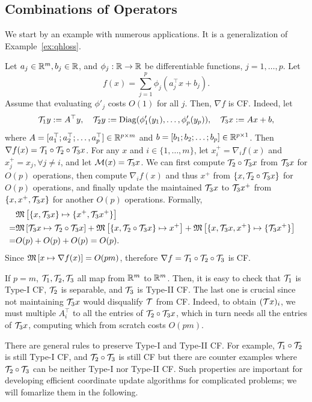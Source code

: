 \subsection{Combinations of Operators}\label{sc:comb}
We start by an example with numerous applications. It is a generalization of Example~\ref{ex:qhloss}.
\begin{example}\label{exp:log-grad} Let $a_j\in \mathbb{R}^m, b_j\in \mathbb{R}$, and $\phi_j:\mathbb{R}\to \mathbb{R}$ be differentiable functions, $j=1,\ldots,p$. Let $$f(x)=\sum_{j=1}^p \phi_j(a_j^\top x +b_j).$$ Assume that evaluating $\phi'_j$ costs $O(1)$ for all $j$. Then, $\nabla f$ is CF. Indeed, let $${\mathcal{T}}_1 y:=A^\top y,\quad {\mathcal{T}}_2 y := {\mathrm{Diag}}(\phi_1'(y_1),\ldots,\phi_p'(y_p)), \quad {\mathcal{T}}_3 x := Ax+b,$$ 
where $A=[a_1^\top; a_2^\top; \ldots,a_p^\top]\in \mathbb{R}^{p\times m}$ and $b=[b_1;b_2;\ldots;b_p]\in\mathbb{R}^{p\times 1}$. Then $\nabla f(x)= {\mathcal{T}}_1\circ{\mathcal{T}}_2\circ{\mathcal{T}}_3 x$. For any $x$ and $i\in\{1,\ldots,m\}$, let $x^+_i=\nabla_i f(x)$ and $x^+_j=x_j,\forall j\neq i$, and let ${\mathcal{M}}(x)={\mathcal{T}}_3 x$. We can first compute ${\mathcal{T}}_2\circ{\mathcal{T}}_3 x$ from ${\mathcal{T}}_3 x$ for $O(p)$ operations, then compute $\nabla_i f(x)$ and thus $x^+$ from $\{x, {\mathcal{T}}_2\circ{\mathcal{T}}_3 x\}$ for $O(p)$ operations, and finally update the maintained ${\mathcal{T}}_3 x$ to ${\mathcal{T}}_3 x^+$ from $\{x, x^+,{\mathcal{T}}_3 x\}$ for another $O(p)$ operations. Formally,
\begin{align*}
&\nops{\{x,\cT_3 x\}}{\{x^+, \cT_3x^+\}}\cr
=& \nops{\cT_3x}{\cT_2\circ\cT_3 x}+\nops {\{x,\cT_2\circ\cT_3 x\}}{x^+}+\nops{\{x,\cT_3 x, x^+\}}{\{\cT_3x^+\}}\cr
=& O(p) + O(p) +O(p)=O(p).\nonumber
\end{align*}
Since $\mathfrak{M}\left[{x}\mapsto {\nabla f(x)}\right]=O(pm)$, therefore
$\nabla f= {\mathcal{T}}_1\circ{\mathcal{T}}_2\circ{\mathcal{T}}_3$ is CF. 

If $p=m$, ${\mathcal{T}}_1,{\mathcal{T}}_2,{\mathcal{T}}_3$ all map from $\mathbb{R}^m$ to $\mathbb{R}^m$. Then, it is easy to check that ${\mathcal{T}}_1$ is Type-I CF, ${\mathcal{T}}_2$ is separable, and ${\mathcal{T}}_3$ is Type-II CF. The last one is crucial since not maintaining ${\mathcal{T}}_3 x$ would disqualify ${\mathcal{T}}$ from CF. Indeed, to obtain $({\mathcal{T}} x)_i$, we must multiple $A_i^\top$ to all the entries of ${\mathcal{T}}_2\circ{\mathcal{T}}_3 x$, which in turn needs all the entries of ${\mathcal{T}}_3 x$, computing which from scratch costs $O(pm)$.

There are general rules to preserve Type-I and Type-II CF. For example, ${\mathcal{T}}_1\circ {\mathcal{T}}_2$ is still Type-I CF, and ${\mathcal{T}}_2\circ{\mathcal{T}}_3$ is still CF but there are counter examples where  ${\mathcal{T}}_2\circ{\mathcal{T}}_3$  can be neither Type-I nor Type-II CF. Such properties are important for developing efficient coordinate update algorithms for complicated problems; we will fomarlize them in the following.
\end{example}

